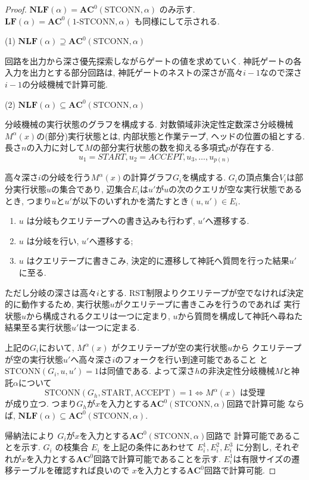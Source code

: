 \documentclass[11pt,a4paper]{jsarticle}
\theoremstyle{definition}
\theoremstyle{remark}
\newcommand{\classfont}{\mathbf}
\newcommand{\AC}{\classfont{AC}}
\newcommand{\cfL}{\classfont{LF}}
\newcommand{\cfNL}{\classfont{NLF}}
\newcommand{\probfont}{\text}
\newcommand{\oneSTCONN}{\probfont{1-STCONN}}
\newcommand{\STCONN}{\probfont{STCONN}}
\begin{document}
\begin{proof}
  $\cfNL(\alpha) = \AC^0(\STCONN, \alpha)$ のみ示す.
 $\cfL(\alpha) = \AC^0(\oneSTCONN, \alpha)$ も同様にして示される.

 (1) $\cfNL(\alpha) \supseteq \AC^0(\STCONN, \alpha)$
 
 回路を出力から深さ優先探索しながらゲートの値を求めていく.
 神託ゲートの各入力を出力とする部分回路は,
 神託ゲートのネストの深さが高々$i-1$なので深さ$i-1$の分岐機械で計算可能.

 (2) $\cfNL(\alpha) \subseteq \AC^0(\STCONN, \alpha)$

 分岐機械の実行状態のグラフを構成する.
 対数領域非決定性定数深さ分岐機械$M^\alpha(x)$の(部分)実行状態とは,
 内部状態と作業テープ, ヘッドの位置の組とする.
 長さ$n$の入力に対して$M$の部分実行状態の数を抑える多項式$p$が存在する.
 \[
 u_1=\mathit{START}, u_2=\mathit{ACCEPT}, u_3, \dots, u_{p(n)}
 \]

 高々深さ$i$の分岐を行う$M^\alpha(x)$の計算グラフ$G_i$を構成する.
 $G_i$の頂点集合$V_i$は部分実行状態$u$の集合であり,
 辺集合$E_i$は$u'$が$u$の次のクエリが空な実行状態であるとき,
 つまり$u$と$u'$が以下のいずれかを満たすとき$(u, u') \in E_i$.
 \begin{enumerate}
 \item $u$ は分岐もクエリテープへの書き込みも行わず,
       $u'$へ遷移する.
 \item $u$ は分岐を行い, $u'$へ遷移する;
 \item $u$ はクエリテープに書きこみ,
       決定的に遷移して神託へ質問を行った結果$u'$に至る.
 \end{enumerate}
 ただし分岐の深さは高々$i$とする.
 RST制限よりクエリテープが空でなければ決定的に動作するため,
 実行状態$u$がクエリテープに書きこみを行うのであれば
 実行状態$u$から構成されるクエリは一つに定まり,
 $u$から質問を構成して神託へ尋ねた結果至る実行状態$u'$は一つに定まる.

 上記の$G_i$において, $M^\alpha(x)$ がクエリテープが空の実行状態$u$から
 クエリテープが空の実行状態$u'$へ高々深さ$i$のフォークを行い到達可能であること
 と$\STCONN(G_i, u, u') = 1$は同値である. 
 よって深さ$h$の非決定性分岐機械$M$と神託$\alpha$について
 \begin{equation*}
 \STCONN(G_h, \mathrm{START}, \mathrm{ACCEPT}) = 1 
 \iff M^\alpha(x) \text{ は受理}
 \end{equation*}
 が成り立つ.
 つまり$G_h$が$x$を入力とする$\AC^0(\STCONN, \alpha)$回路で計算可能
 ならば, $\cfNL(\alpha) \subseteq \AC^0(\STCONN, \alpha)$.

 帰納法により $G_i$が$x$を入力とする$\AC^0(\STCONN, \alpha)$回路で
 計算可能であることを示す.
 $G_i$ の枝集合 $E_i$ を上記の条件にあわせて $E^1_i, E^2_i, E^3_i$ に分割し,
 それぞれが$x$を入力とする$\AC^0$回路で計算可能であることを示す.
 $E^1_i$は有限サイズの遷移テーブルを確認すれば良いので
 $x$を入力とする$\AC^0$回路で計算可能.


\end{proof}
\end{document}

